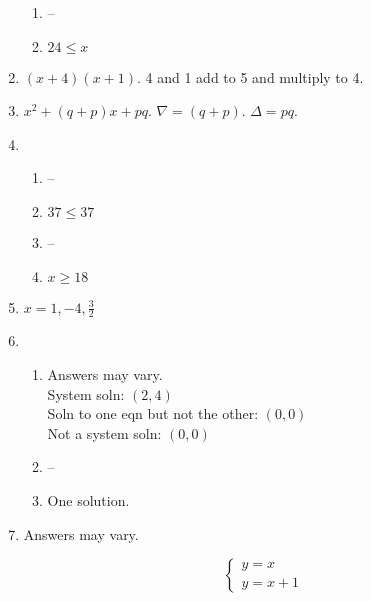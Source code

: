 \documentclass{article}
\begin{document}
\begin{enumerate}
\begin{enumerate}
	\item --
	
	\item $24 \leq x$
	
	\end{enumerate}
	
\item $(x + 4)(x + 1)$. 4 and 1 add to 5 and multiply to 4.

\item $x^2 + (q + p)x + pq$. $\nabla = (q + p)$. $\Delta = pq$.

\item

	\begin{enumerate}
	
	\item --
	
	\item $37 \leq 37$
	
	\item --
	
	\item $x \geq 18$
	
	\end{enumerate}
	
\item $x = 1, -4, \frac{3}{2}$

\item

	\begin{enumerate}
	
	\item Answers may vary. \\ System soln: $(2, 4)$ \\ Soln to one eqn but not the other: $(0, 0)$ \\ Not a system soln: $(0, 0)$
	
	\item --
	
	\item One solution.
	
	\end{enumerate}
	
\item Answers may vary. 

	\begin{equation*}
	\begin{cases}
	y = x \\
	y = x + 1
	\end{cases}
	\end{equation*}
	

\end{enumerate}
\end{document}
